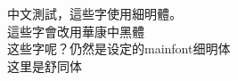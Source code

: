 \documentclass{article}
\begin{document}
中文測試，這些字使用細明體。 \\
{\sffamily 這些字會改用華康中黑體} \\
{这些字呢？仍然是设定的mainfont细明体} \\
{\shu 这里是舒同体}
\end{document}
